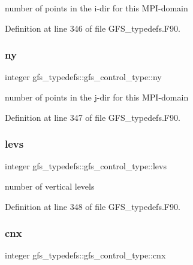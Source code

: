 number of points in the i-\/dir for this M\+P\+I-\/domain 



Definition at line 346 of file G\+F\+S\+\_\+typedefs.\+F90.

\mbox{\label{structgfs__typedefs_1_1gfs__control__type_abf565472513bff9d0db64de492d0665a}} 
\subsubsection{ny}
{\footnotesize\ttfamily integer gfs\+\_\+typedefs\+::gfs\+\_\+control\+\_\+type\+::ny}



number of points in the j-\/dir for this M\+P\+I-\/domain 



Definition at line 347 of file G\+F\+S\+\_\+typedefs.\+F90.

\mbox{\label{structgfs__typedefs_1_1gfs__control__type_aa7409f2c8f458bc4c36d593d5ab0e7e0}} 
\subsubsection{levs}
{\footnotesize\ttfamily integer gfs\+\_\+typedefs\+::gfs\+\_\+control\+\_\+type\+::levs}



number of vertical levels 



Definition at line 348 of file G\+F\+S\+\_\+typedefs.\+F90.

\mbox{\label{structgfs__typedefs_1_1gfs__control__type_af955344d7ceea1cb1928755eb249680a}} 
\subsubsection{cnx}
{\footnotesize\ttfamily integer gfs\+\_\+typedefs\+::gfs\+\_\+control\+\_\+type\+::cnx}




